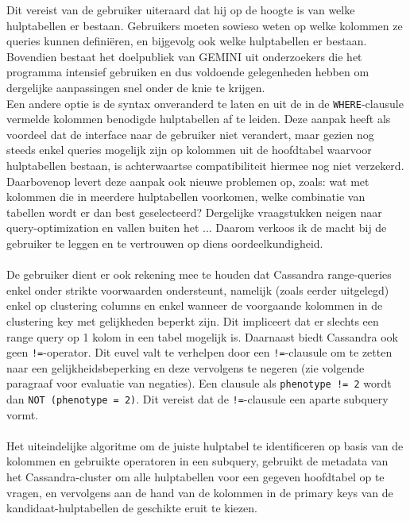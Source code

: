 Dit vereist van de gebruiker uiteraard dat hij op de hoogte is van welke hulptabellen er bestaan. Gebruikers moeten sowieso weten op welke kolommen ze queries kunnen defini\"eren, en bijgevolg ook welke hulptabellen er bestaan. Bovendien bestaat het doelpubliek van GEMINI uit onderzoekers die het programma intensief gebruiken en dus voldoende gelegenheden hebben om dergelijke aanpassingen snel onder de knie te krijgen.\\
Een andere optie is de syntax onveranderd te laten en uit de in de \texttt{WHERE}-clausule vermelde kolommen benodigde hulptabellen af te leiden. Deze aanpak heeft als voordeel dat de interface naar de gebruiker niet verandert, maar gezien nog steeds enkel queries mogelijk zijn op kolommen uit de hoofdtabel waarvoor hulptabellen bestaan, is achterwaartse compatibiliteit hiermee nog niet verzekerd. Daarbovenop levert deze aanpak ook nieuwe problemen op, zoals: wat met kolommen die in meerdere hulptabellen voorkomen, welke combinatie van tabellen wordt er dan best geselecteerd? Dergelijke vraagstukken neigen naar query-optimization en vallen buiten het ... Daarom verkoos ik de macht bij de gebruiker te leggen en te vertrouwen op diens oordeelkundigheid.\\\\
De gebruiker dient er ook rekening mee te houden dat Cassandra range-queries enkel onder strikte voorwaarden ondersteunt, namelijk (zoals eerder uitgelegd) enkel op clustering columns en enkel wanneer de voorgaande kolommen in de clustering key met gelijkheden beperkt zijn. Dit impliceert dat er slechts een range query op 1 kolom in een tabel mogelijk is. Daarnaast biedt Cassandra ook geen \texttt{!=}-operator. Dit euvel valt te verhelpen door een \texttt{!=}-clausule om te zetten naar een gelijkheidsbeperking en deze vervolgens te negeren (zie volgende paragraaf voor evaluatie van negaties). Een clausule als \texttt{phenotype != 2} wordt dan \texttt{NOT (phenotype = 2)}. Dit vereist dat de \texttt{!=}-clausule een aparte subquery vormt.\\\\

Het uiteindelijke algoritme om de juiste hulptabel te identificeren op basis van de kolommen en gebruikte operatoren in een subquery, gebruikt de metadata van het Cassandra-cluster om alle hulptabellen voor een gegeven hoofdtabel op te vragen, en vervolgens aan de hand van de kolommen in de primary keys van de kandidaat-hulptabellen de geschikte eruit te kiezen.

